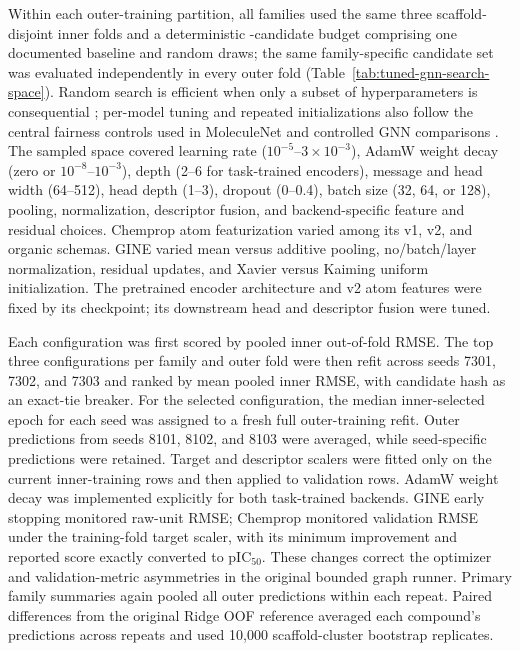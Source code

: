\documentclass[11pt]{article}
\begin{document}
Within each outer-training partition, all families used the same three
scaffold-disjoint inner folds and a deterministic
\TunedGNNCandidateBudget{}-candidate budget comprising one documented baseline
and \TunedGNNRandomDrawCount{} random draws; the same family-specific candidate
set was evaluated independently in every outer fold
(Table~\ref{tab:tuned-gnn-search-space}). Random search is efficient when only a
subset of hyperparameters is consequential \citep{bergstra2012random}; per-model
tuning and repeated initializations also follow the central fairness controls
used in MoleculeNet and controlled GNN comparisons
\citep{wu2018moleculenet,errica2020fair}. The sampled space covered learning rate
($10^{-5}$--$3\times10^{-3}$), AdamW weight decay (zero or
$10^{-8}$--$10^{-3}$), depth (2--6 for task-trained encoders), message and head
width (64--512), head depth (1--3), dropout (0--0.4), batch size (32, 64, or
128), pooling, normalization, descriptor fusion, and backend-specific feature
and residual choices. Chemprop atom featurization varied among its v1, v2, and
organic schemas. GINE varied mean versus additive pooling, no/batch/layer
normalization, residual updates, and Xavier versus Kaiming uniform
initialization. The pretrained encoder architecture and v2 atom features were
fixed by its checkpoint; its downstream head and descriptor fusion were tuned.

Each configuration was first scored by pooled inner out-of-fold RMSE. The top
three configurations per family and outer fold were then refit across seeds
7301, 7302, and 7303 and ranked by mean pooled inner RMSE, with candidate hash as
an exact-tie breaker. For the selected configuration, the median inner-selected
epoch for each seed was assigned to a fresh full outer-training refit. Outer
predictions from seeds 8101, 8102, and 8103 were averaged, while seed-specific
predictions were retained. Target and descriptor scalers were fitted only on
the current inner-training rows and then applied to validation rows. AdamW
weight decay was implemented explicitly for both task-trained backends. GINE
early stopping monitored raw-unit RMSE; Chemprop monitored validation RMSE under
the training-fold target scaler, with its minimum improvement and reported score
exactly converted to pIC$_{50}$. These changes correct the optimizer and
validation-metric asymmetries in the original bounded graph runner. Primary
family summaries again pooled all \DevelopmentCount{} outer predictions within each repeat.
Paired differences from the original Ridge OOF reference averaged each
compound's predictions across repeats and used 10,000 scaffold-cluster bootstrap
replicates.
\end{document}
